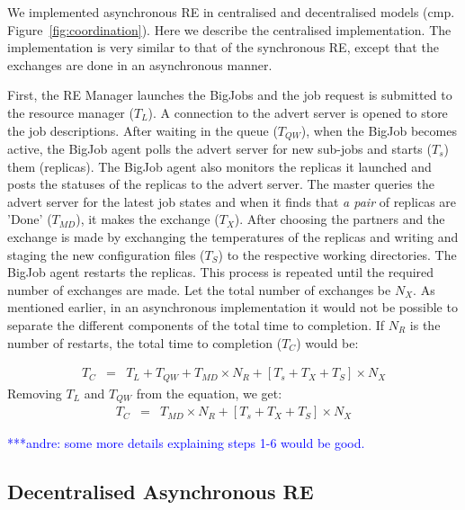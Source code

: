 \documentclass{rspublic}
\newcommand{\alnote}[1]{ {\textcolor{blue} { ***andre: #1 }}}
\newcommand{\alnote}[1]{}
\begin{document}
We implemented asynchronous RE in centralised and decentralised models 
(cmp. Figure~\ref{fig:coordination}). Here we describe the centralised 
implementation. The implementation is very similar to that of the 
synchronous RE, except that the exchanges are done in an asynchronous manner. 

First, the RE Manager launches the BigJobs and the job request is submitted to the resource manager ($T_{L}$). A connection to the advert server is opened to store the job descriptions. 
After waiting in the queue ($T_{QW}$), when the BigJob becomes active, 
the BigJob agent polls the advert server for new sub-jobs 
and starts ($T_{s}$) them (replicas). The BigJob agent also monitors the 
replicas it launched and posts the statuses of the replicas to the advert 
server. The master queries the advert server for the latest job 
states and when it finds that \emph{a pair} of replicas are 'Done' ($T_{MD}$), it 
makes the exchange ($T_{X}$). After choosing the partners and the exchange is made by exchanging the temperatures of the replicas and writing and staging the new configuration files ($T_{S}$)
to the respective working directories. The BigJob agent restarts the replicas. This process is repeated until the required number of 
exchanges are made. Let the total number of exchanges be $N_{X}$. As mentioned earlier, in an asynchronous implementation it would not be possible to separate the different components of the total time to completion. If $N_{R}$ is the number of restarts, the total time to completion ($T_{C}$) would be:

  \begin{eqnarray}
T_{C} &=& T_{L}+T_{QW}+T_{MD} \times N_{R} + [T_{s} + T_{X}+T_{S}] \times N_{X}
\label{eq:equation}
\end{eqnarray}
Removing $T_{L}$ and $T_{QW}$ from the equation, we get:
  \begin{eqnarray}
T_{C} &=& T_{MD} \times N_{R} + [T_{s} + T_{X}+T_{S}] \times N_{X}
\label{eq:equat}
\end{eqnarray}





 \alnote{some more details explaining steps 1-6 would be good.}%

\subsection{Decentralised Asynchronous RE}
\end{document}
